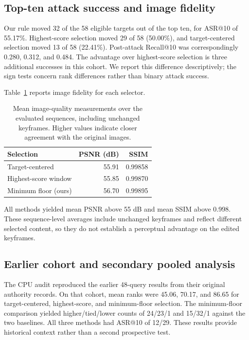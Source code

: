 \documentclass[runningheads]{llncs}
\begin{document}
\subsection{Top-ten attack success and image fidelity}

Our rule moved 32 of the 58 eligible targets out of the top ten, for ASR@10 of 55.17\%. Highest-score selection moved 29 of 58 (50.00\%), and target-centered selection moved 13 of 58 (22.41\%). Post-attack Recall@10 was correspondingly 0.280, 0.312, and 0.484. The advantage over highest-score selection is three additional successes in this cohort. We report this difference descriptively; the sign tests concern rank differences rather than binary attack success.

Table~\ref{tab:image-quality} reports image fidelity for each selector.
\begin{table}[!htbp]
\centering
\caption{Mean image-quality measurements over the evaluated sequences, including unchanged keyframes. Higher values indicate closer agreement with the original images.}
\label{tab:image-quality}
\begin{tabular}{lrr}
\toprule
Selection & PSNR (dB) & SSIM \\
\midrule
Target-centered & 55.91 & 0.99858 \\
Highest-score window & 55.85 & 0.99870 \\
Minimum floor (ours) & 56.70 & 0.99895 \\
\bottomrule
\end{tabular}
\end{table}

All methods yielded mean PSNR above 55 dB and mean SSIM above 0.998. These sequence-level averages include unchanged keyframes and reflect different selected content, so they do not establish a perceptual advantage on the edited keyframes.

\subsection{Earlier cohort and secondary pooled analysis}

The CPU audit reproduced the earlier 48-query results from their original authority records. On that cohort, mean ranks were 45.06, 70.17, and 86.65 for target-centered, highest-score, and minimum-floor selection. The minimum-floor comparison yielded higher/tied/lower counts of 24/23/1 and 15/32/1 against the two baselines. All three methods had ASR@10 of 12/29. These results provide historical context rather than a second prospective test.
\end{document}

